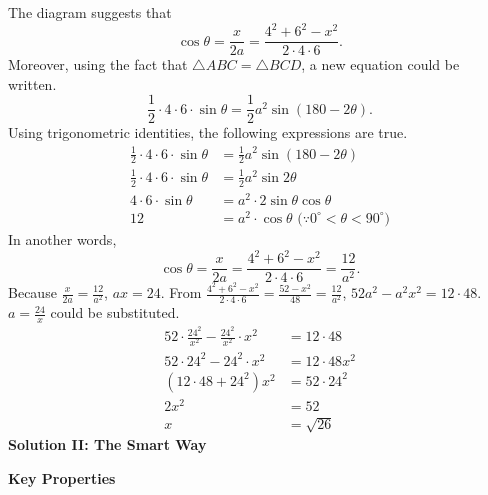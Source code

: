 \documentclass{article}
\begin{document}
The diagram suggests that
\[
\cos\theta = \frac{x}{2a}
= \frac{4^2 + 6^2 - x^2}{2 \cdot 4 \cdot 6}.
\]
Moreover, using the fact that
$\triangle{ABC} = \triangle{BCD}$, a new equation
could be written.
\[
\frac{1}{2} \cdot 4 \cdot 6 \cdot \sin\theta
= \frac{1}{2} a^2 \sin(180 - 2\theta).
\]
Using trigonometric identities, the following
expressions are true.
\begin{align*}
    \frac{1}{2} \cdot 4 \cdot 6 \cdot \sin\theta
    &= \frac{1}{2} a^2 \sin(180 - 2\theta) \\
    \frac{1}{2} \cdot 4 \cdot 6 \cdot \sin\theta
    &= \frac{1}{2} a^2 \sin2\theta \\
    4 \cdot 6 \cdot \sin\theta
    &= a^2 \cdot 2 \sin\theta \cos\theta \\
    12 &= a^2 \cdot \cos\theta
    \text{ ($\because 0^{\circ} < \theta < 90^{\circ}$)}
\end{align*}
In another words,
\[
\cos\theta = \frac{x}{2a}
= \frac{4^2 + 6^2 - x^2}{2 \cdot 4 \cdot 6}
= \frac{12}{a^2}.
\]
Because $\frac{x}{2a} = \frac{12}{a^2}$, $ax = 24$.
From $\frac{4^2 + 6^2 - x^2}{2 \cdot 4 \cdot 6}
= \frac{52 - x^2}{48} = \frac{12}{a^2}$,
$52a^2 - a^2 x^2 = 12 \cdot 48$. $a = \frac{24}{x}$
could be substituted.
\begin{align*}
    52 \cdot \frac{24^2}{x^2} - \frac{24^2}{x^2}
    \cdot x^2 &= 12 \cdot 48 \\
    52 \cdot 24^2 - 24^2 \cdot x^2 &= 12 \cdot 48x^2 \\
    (12 \cdot 48 + 24^2) x^2 &= 52 \cdot 24^2 \\
    2x^2 &= 52 \\
    x &= \boxed{\sqrt{26}}
\end{align*}
\newpage
\textbf{Solution II: The Smart Way}

\textbf{Key Properties}
\end{document}
